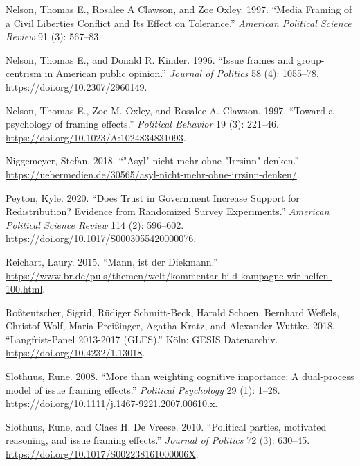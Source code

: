 \documentclass[
  12pt,
]{article}
\newlength{\cslhangindent}
\newlength{\cslentryspacingunit} %
\newenvironment{CSLReferences}[2] %
 {%
  \setlength{\parindent}{0pt}
  \ifodd #1
  \let\oldpar\par
  \def\par{\hangindent=\cslhangindent\oldpar}
  \fi
  \setlength{\parskip}{#2\cslentryspacingunit}
 }%
 {}
\begin{document}
\begin{CSLReferences}{1}{0}
\leavevmode{}%
Nelson, Thomas E., Rosalee A Clawson, and Zoe Oxley. 1997. {``{Media Framing of a Civil Liberties Conflict and Its Effect on Tolerance}.''} \emph{American Political Science Review} 91 (3): 567--83.

\leavevmode{}%
Nelson, Thomas E., and Donald R. Kinder. 1996. {``{Issue frames and group-centrism in American public opinion}.''} \emph{Journal of Politics} 58 (4): 1055--78. \url{https://doi.org/10.2307/2960149}.

\leavevmode{}%
Nelson, Thomas E., Zoe M. Oxley, and Rosalee A. Clawson. 1997. {``{Toward a psychology of framing effects}.''} \emph{Political Behavior} 19 (3): 221--46. \url{https://doi.org/10.1023/A:1024834831093}.

\leavevmode{}%
Niggemeyer, Stefan. 2018. {``{"Asyl" nicht mehr ohne "Irrsinn" denken}.''} \url{https://uebermedien.de/30565/asyl-nicht-mehr-ohne-irrsinn-denken/}.

\leavevmode{}%
Peyton, Kyle. 2020. {``{Does Trust in Government Increase Support for Redistribution? Evidence from Randomized Survey Experiments}.''} \emph{American Political Science Review} 114 (2): 596--602. \url{https://doi.org/10.1017/S0003055420000076}.

\leavevmode{}%
Reichart, Laury. 2015. {``{Mann, ist der Diekmann}.''} \url{https://www.br.de/puls/themen/welt/kommentar-bild-kampagne-wir-helfen-100.html}.

\leavevmode{}%
Roßteutscher, Sigrid, Rüdiger Schmitt-Beck, Harald Schoen, Bernhard Weßels, Christof Wolf, Maria Preißinger, Agatha Kratz, and Alexander Wuttke. 2018. {``{Langfrist-Panel 2013-2017 (GLES)}.''} K{ö}ln: GESIS Datenarchiv. \url{https://doi.org/10.4232/1.13018}.

\leavevmode{}%
Slothuus, Rune. 2008. {``{More than weighting cognitive importance: A dual-process model of issue framing effects}.''} \emph{Political Psychology} 29 (1): 1--28. \url{https://doi.org/10.1111/j.1467-9221.2007.00610.x}.

\leavevmode{}%
Slothuus, Rune, and Claes H. De Vreese. 2010. {``{Political parties, motivated reasoning, and issue framing effects}.''} \emph{Journal of Politics} 72 (3): 630--45. \url{https://doi.org/10.1017/S002238161000006X}.


\end{CSLReferences}
\end{document}
